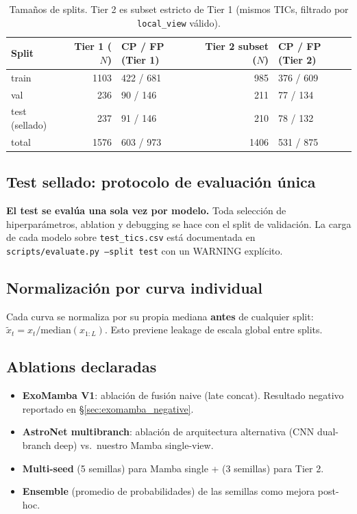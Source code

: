 \documentclass[11pt, a4paper]{article}
\begin{document}
\begin{table}[h]
\centering
\small
\begin{tabular}{lrlrl}
\toprule
Split & Tier 1 ($N$) & CP / FP (Tier 1) & Tier 2 subset ($N$) & CP / FP (Tier 2) \\
\midrule
train & 1103 & 422 / 681 & 985 & 376 / 609 \\
val & 236 & 90 / 146 & 211 & 77 / 134 \\
test (sellado) & 237 & 91 / 146 & 210 & 78 / 132 \\
total & 1576 & 603 / 973 & 1406 & 531 / 875 \\
\bottomrule
\end{tabular}
\caption{Tamaños de splits. Tier 2 es subset estricto de Tier 1 (mismos TICs, filtrado por \texttt{local\_view} válido).}
\end{table}

\subsection{Test sellado: protocolo de evaluación única}

\textbf{El test se evalúa una sola vez por modelo.} Toda selección de hiperparámetros, ablation y debugging se hace con el split de validación. La carga de cada modelo sobre \texttt{test\_tics.csv} está documentada en \texttt{scripts/evaluate.py --split test} con un WARNING explícito.

\subsection{Normalización por curva individual}

Cada curva se normaliza por su propia mediana \textbf{antes} de cualquier split: $\tilde{x}_t = x_t / \text{median}(x_{1:L})$. Esto previene leakage de escala global entre splits.

\subsection{Ablations declaradas}

\begin{itemize}[leftmargin=*, topsep=0pt]
    \item \textbf{ExoMamba V1}: ablación de fusión naive (late concat). Resultado negativo reportado en \S\ref{sec:exomamba_negative}.
    \item \textbf{AstroNet multibranch}: ablación de arquitectura alternativa (CNN dual-branch deep) vs.\ nuestro Mamba single-view.
    \item \textbf{Multi-seed} (5 semillas) para Mamba single + (3 semillas) para Tier 2.
    \item \textbf{Ensemble} (promedio de probabilidades) de las semillas como mejora post-hoc.
\end{itemize}
\end{document}
